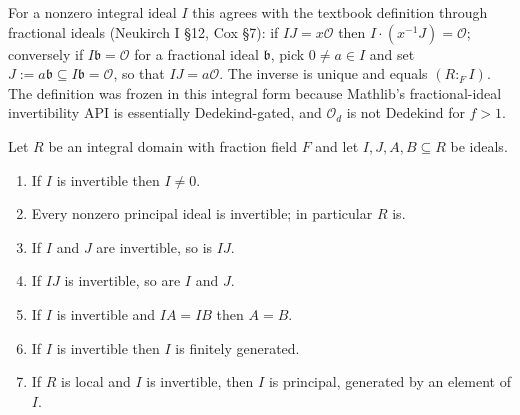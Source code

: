 \begin{remark}\label{infra-invertibility-def-remark}
  For a nonzero integral ideal $I$ this agrees with the textbook definition
  through fractional ideals (Neukirch I \S 12, Cox \S 7): if $I J = x\mathcal{O}$
  then $I \cdot (x^{-1} J) = \mathcal{O}$; conversely if $I \mathfrak{b} = \mathcal{O}$
  for a fractional ideal $\mathfrak{b}$, pick $0 \neq a \in I$ and set
  $J := a \mathfrak{b} \subseteq I\mathfrak{b} = \mathcal{O}$, so that $I J = a \mathcal{O}$.
  The inverse is unique and equals $(R :_F I)$. The definition was frozen in
  this integral form because Mathlib's fractional-ideal invertibility API is
  essentially Dedekind-gated, and $\mathcal{O}_d$ is not Dedekind for $f > 1$.
\end{remark}

\begin{proposition}\label{infra-invertibility-arith}
  Let $R$ be an integral domain with fraction field $F$ and let
  $I, J, A, B \subseteq R$ be ideals.
  \begin{enumerate}
    \item[(a)] If $I$ is invertible then $I \neq 0$.
    \item[(b)] Every nonzero principal ideal is invertible; in particular $R$ is.
    \item[(c)] If $I$ and $J$ are invertible, so is $IJ$.
    \item[(d)] If $IJ$ is invertible, so are $I$ and $J$.
    \item[(e)] If $I$ is invertible and $IA = IB$ then $A = B$.
    \item[(f)] If $I$ is invertible then $I$ is finitely generated.
    \item[(g)] If $R$ is local and $I$ is invertible, then $I$ is principal,
      generated by an element of $I$.
  \end{enumerate}
\end{proposition}

